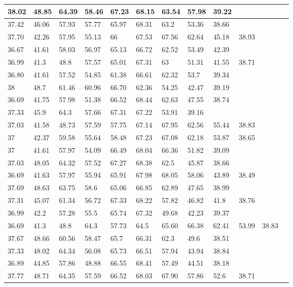 \begin{longtable}{ | l | l | l | l | l | l | l | l | l | l | l | l }
\hline
	38.02 & 48.85 & 64.39 & 58.46 & 67.23 & 68.15 & 63.54 & 57.98 & 39.22  & &  \\ \hline
	37.42 & 46.06 & 57.93 & 57.77 & 65.97 & 68.31 & 63.2 & 53.36 & 38.66 && \\ \hline
	37.70 & 42.26 & 57.95 & 55.13 & 66 & 67.53 & 67.56 & 62.64 & 45.18 & 38.93  & \\ \hline
	36.67 & 41.61 & 58.03 & 56.97 & 65.13 & 66.72 & 62.52 & 53.49 & 42.39 && \\ \hline
	36.99 & 41.3 & 48.8 & 57.57 & 65.01 & 67.31 & 63 & 51.31 & 41.55 & 38.71 & \\ \hline
	36.80 & 41.61 & 57.52 & 54.85 & 61.38 & 66.61 & 62.32 & 53.7 & 39.34 && \\ \hline
	38 & 48.7 & 61.46 & 60.96 & 66.70 & 62.36 & 54.25 & 42.47 & 39.19 && \\ \hline
	36.69 & 41.75 & 57.98 & 51.38 & 66.52 & 68.44 & 62.63 & 47.55 & 38.74 && \\ \hline
	37.33 & 45.9 & 64.3 & 57.66 & 67.31 & 67.22 & 53.91 & 39.16 &  && \\ \hline
	37.03 & 41.58 & 48.73 & 57.59 & 57.75 & 67.14 & 67.95 & 62.56 & 55.44 & 38.83 &    \\ \hline
	37 & 42.37 & 59.58 & 55.64 & 58.48 & 67.23 & 67.08 & 62.18 & 53.87 & 38.65 & \\ \hline
	37 & 41.61 & 57.97 & 54.09 & 66.49 & 68.04 & 66.36 & 51.82 & 39.09  & &\\ \hline
	37.03 & 48.05 & 64.32 & 57.52 & 67.27 & 68.38 & 62.5 & 45.87 & 38.66  & & \\ \hline
	36.69 & 41.63 & 57.97 & 55.94 & 65.91 & 67.98 & 68.05 & 58.06 & 43.89 & 38.49  & \\ \hline
	37.69 & 48.63 & 63.75 & 58.6 & 65.06 & 66.85 & 62.89 & 47.65 & 38.99&&    \\ \hline
	37.31 & 45.07 & 61.34 & 56.72 & 67.33 & 68.22 & 57.82 & 46.82 & 41.8 & 38.76  &  \\ \hline
	36.99 & 42.2 & 57.28 & 55.5 & 65.74 & 67.32 & 49.68 & 42.23 & 39.37   &&\\ \hline
	36.69 & 41.3 & 48.8 & 64.3 & 57.73 & 64.5 & 65.60 & 66.38 & 62.41 & 53.99 & 38.83  \\ \hline
	37.67 & 48.66 & 60.56 & 58.47 & 65.7 & 66.31 & 62.3 & 49.6 & 38.51&&  \\ \hline
	37.33 & 48.02 & 64.34 & 56.08 & 65.73 & 66.51 & 57.94 & 43.94 & 38.84 &&   \\ \hline
	36.89 & 44.85 & 57.86 & 48.88 & 66.55 & 68.41 & 57.49 & 44.51 & 38.18  && \\ \hline
	37.77 & 48.71 & 64.35 & 57.59 & 66.52 & 68.03 & 67.90 & 57.86 & 52.6 & 38.71 &  \\ \hline	
\end{longtable}

